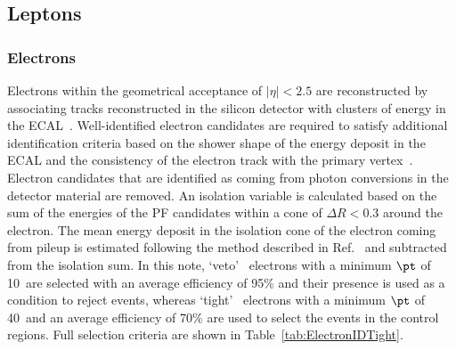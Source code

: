 \subsection{Leptons}

\subsubsection{Electrons}

Electrons within the geometrical acceptance of $|\eta| < 2.5$
are reconstructed by associating tracks reconstructed
in the silicon detector with clusters of energy in the ECAL~\cite{Khachatryan:2015hwa}.
Well-identified electron candidates are required to satisfy
additional identification criteria based on the shower
shape of the energy deposit in the ECAL and the consistency of the
electron track with the primary vertex~\cite{TRK-11-001}. Electron candidates
that are identified as coming from photon conversions in
the detector material are removed. An isolation variable is calculated based on the sum of the energies of the PF candidates 
within a cone of $\Delta R < 0.3$ around the electron. The mean energy deposit in the isolation cone of the electron coming 
from pileup is estimated following the method described in Ref.~\cite{Khachatryan:2015hwa} and subtracted from the isolation sum. 
In this note, `veto'~\cite{CMS-EGM-TWIKI-ELEID} electrons with a minimum $\pt$ of 10~\GeV are selected with an average efficiency 
of 95\% and their presence is used as a condition to reject events, whereas `tight'~\cite{CMS-EGM-TWIKI-ELEID} electrons with a 
minimum $\pt$ of 40~\GeV and an average efficiency of 70\% are used to select the events
in the control regions. Full selection criteria are shown in Table~\ref{tab:ElectronIDTight}.

